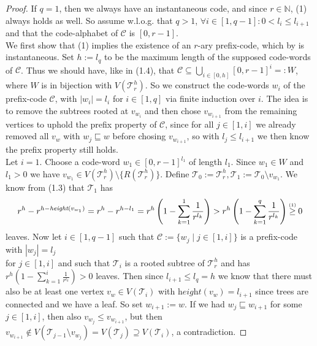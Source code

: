 \documentclass[12pt]{article}
\newcommand{\up}[2]{\mathrel{\overset{\makebox[0pt]{\mbox{\normalfont\tiny #2}}}{#1}}}
\newcommand{\T}[0]{{\mathcal{T}_r^h}}
\newcommand{\he}[0]{\textit{height}}
\newenvironment{statement3}[3]{\begin{trivlist}
\item[\hskip \labelsep {\bfseries #1}\hskip \labelsep {\bfseries #2} {#3}\textbf{.}]}{\end{trivlist}}
\begin{document}
\begin{statement3}{(1.7)}{Theorem}{(Kraft's Inequality)}
    \begin{proof}
        If $q = 1$, then we always have an instantaneous code, and since $r \in \mathbb{N}$, (1) always holds
        as well.
        So assume w.l.o.g. that $q > 1$, $\forall i \in [1,q-1]: 0 < l_i \leq l_{i+1}$
        and that the code-alphabet of $\mathcal{C}$ is $[0,r-1]$.\\[10pt]
        We first show that (1) implies the existence of an $r$-ary prefix-code, which by
        \cite{ICT} is instantaneous.
        Set $h := l_q$ to be the maximum length of the supposed code-words of $\mathcal{C}$.
        Thus we should have, like in (1.4), that $\mathcal{C} \subseteq \bigcup_{i \in [0,h]} [0,r-1]^i =: W$, where
        $W$ is in bijection with $V(\T)$.
        So we construct the code-words $w_i$ of the prefix-code $\mathcal{C}$, with $|w_i| = l_i$ for $i \in [1,q]$
        via finite induction over $i$. The idea is to remove the subtrees rooted at $v_{w_i}$ and then
        chose $v_{w_{i+1}}$ from the remaining vertices to uphold the prefix property of $\mathcal{C}$,
        since for all $j \in [1,i]$ we already removed all $v_{w}$ with $w_j \sqsubseteq w$
        before chosing $v_{w_{i+1}}$, so with $l_j \leq l_{i+1}$ we then know the prefix property still holds.\\[10pt]
        Let $i = 1$. Choose a code-word $w_1 \in [0,r-1]^{l_1}$ of length $l_1$. Since $w_1 \in W$ and $l_1 > 0$ we have
        $v_{w_1} \in V(\T) \setminus \{R(\T)\}$. Define $\mathcal{T}_0 := \T, \mathcal{T}_1 := \mathcal{T}_0 \setminus v_{w_1}$. We know
        from (1.3) that $\mathcal{T}_1$ has
        $$
            r^h - r^{h - \he(v_{w_1})} = r^h - r^{h - l_1} = r^h\left(1 - \sum_{k=1}^{1} \frac{1}{r^{l_k}}\right)
            > r^h\left(1 - \sum_{k=1}^{q} \frac{1}{r^{l_k}}\right) \up{\geq}{(1)} 0
        $$
        leaves. Now let $i \in [1,q-1]$ such that $\mathcal{C} := \{w_j \mid j \in [1,i]\}$ is a prefix-code
        with $|w_j| = l_j$\\[2pt]
        for $j \in [1,i]$ and such that $\mathcal{T}_i$ is a rooted subtree of $\T$ and has $r^h(1 - \sum_{k=1}^{i}\frac{1}{r^{l_k}}) > 0$ leaves.
        Then since $l_{i+1} \leq l_q = h$ we know that there must also be at least one vertex
        $v_w \in V(\mathcal{T}_i)$ with $\he(v_w) = l_{i+1}$ since trees are connected and we have a leaf.
        So set $w_{i+1} := w$. If we had $w_j \sqsubseteq w_{i+1}$ for
        some $j \in [1,i]$, then also $v_{w_j} \leq v_{w_{i+1}}$, but then
        $v_{w_{i+1}} \notin V(\mathcal{T}_{j-1} \setminus v_{w_j}) = V(\mathcal{T}_{j}) \supseteq V(\mathcal{T}_{i})$, a contradiction.

\end{proof}
\end{statement3}
\end{document}
